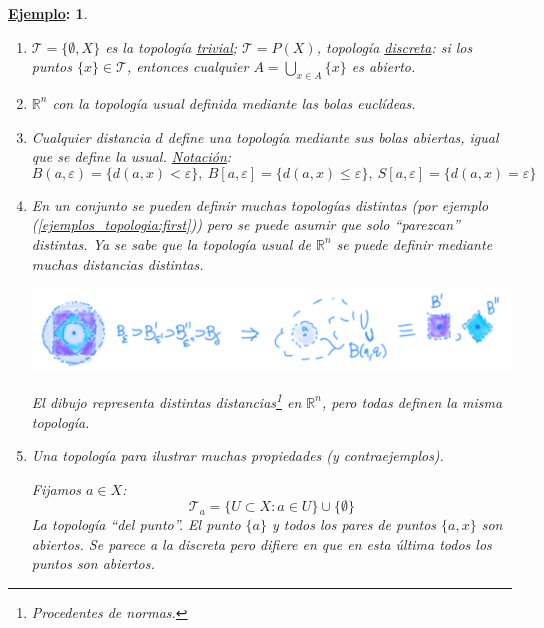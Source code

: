 \documentclass[10pt,a4paper,openright]{book}
\theoremstyle{break}
\newtheorem*{ej}{\underline{Ejemplo}:}
\begin{document}
\begin{ej}
\begin{enumerate}
    \item \label{ejemplos_topologia:first} $\mathcal{T} = \{\emptyset, X\}$ es la topología \underline{trivial}; $\mathcal{T} = P\left( X \right)$, topología \underline{discreta}: si los puntos $\{x\} \in \mathcal{T}$, entonces cualquier $A = \bigcup_{x \in A} \{x\}$ es abierto.
    \item $\mathbb{R}^n$ con la topología usual definida mediante las bolas euclídeas.
    \item Cualquier distancia $d$ define una topología mediante sus bolas abiertas, igual que se define la usual. \underline{Notación}: 
    \[
    B\left( a, \varepsilon \right) = \{d\left( a, x \right) < \varepsilon\},\ B\left[ a, \varepsilon \right] = \{d\left( a, x \right) \le \varepsilon \},\ S\left[ a, \varepsilon \right] = \{d\left( a, x \right) = \varepsilon\} 
    \]
    \item En un conjunto se pueden definir muchas topologías distintas (por ejemplo (\ref{ejemplos_topologia:first})) pero se puede asumir que solo ``parezcan'' distintas. Ya se sabe que la topología usual de $\mathbb{R}^n$ se puede definir mediante muchas distancias distintas.

    \begin{center}
        \includegraphics[scale=0.2]{images/topologia_metricas}  

        \textit{El dibujo representa distintas distancias\footnote{Procedentes de \textit{normas}.} en $\mathbb{R}^n$, pero todas definen la misma topología.} 
    \end{center}
    \item Una topología para ilustrar muchas propiedades (y contraejemplos). 

    Fijamos $a \in X$:
    \[
    \mathcal{T}_a = \{U \subset X: a \in U\} \cup \{\emptyset\} 
    \]
    La topología ``del punto''. El punto $\{a\}$ y todos los pares de puntos $\{a, x\}$ son abiertos. Se parece a la discreta pero difiere en que en esta última todos los puntos son abiertos.
\end{enumerate}
\end{ej}
\end{document}
